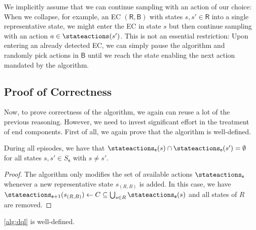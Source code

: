 \documentclass{theoretics}
\newcommand{\intersectionSym}{\cap}
\newcommand{\intersectionBin}{\mathbin{\intersectionSym}}
\newcommand{\UnionSym}{\bigcup}
\newcommand{\intersection}{\intersectionBin}
\newcommand{\Union}{\UnionSym}
\newcommand{\States}{S}
\newcommand{\algoepisode}{\mathsf{e}}
\begin{document}
\begin{remark}
	We implicitly assume that we can continue sampling with an action of our choice:
	When we collapse, for example, an EC $(\mathsf{R}, \mathsf{B})$ with states $s, s' \in \mathsf{R}$ into a single representative state, we might enter the EC in state $s$ but then continue sampling with an action $a \in \stateactions(s')$.
	This is not an essential restriction:
	Upon entering an already detected EC, we can simply pause the algorithm and randomly pick actions in $\mathsf{B}$ until we reach the state enabling the next action mandated by the algorithm.
\end{remark}

\subsection{Proof of Correctness}
Now, to prove correctness of the algorithm, we again can reuse a lot of the previous reasoning.
However, we need to invest significant effort in the treatment of end components.
First of all, we again prove that the algorithm is well-defined.
\begin{lemma} \label{stm:dql:disjoint_actions}
	During all episodes, we have that $\stateactions_{\algoepisode}(s) \intersection \stateactions_{\algoepisode}(s') = \emptyset$ for all states $s, s' \in \States_\algoepisode$ with $s \neq s'$.
\end{lemma}

\begin{proof}
	The algorithm only modifies the set of available actions $\stateactions_{\algoepisode}$ whenever a new representative state $s_{(R, B)}$ is added.
	In this case, we have $\stateactions_{\algoepisode + 1}(s_{(R, B)}) \gets C \subseteq \Union_{s \in R} \stateactions_{\algoepisode}(s)$ and all states of $R$ are removed. 
\end{proof}

\begin{lemma}
	\cref{alg:dql} is well-defined.
\end{lemma}
\end{document}
